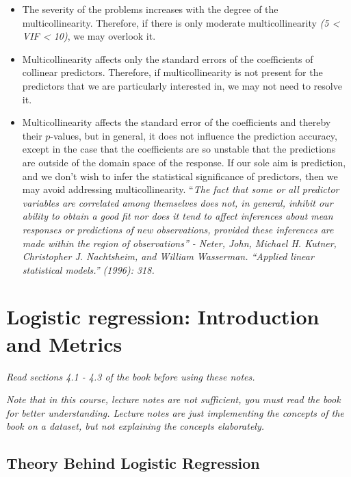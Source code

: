 \documentclass[
  letterpaper,
  DIV=11,
  numbers=noendperiod]{scrreprt}
\begin{document}
\begin{itemize}
\item
  The severity of the problems increases with the degree of the
  multicollinearity. Therefore, if there is only moderate
  multicollinearity \emph{(5 \textless{} VIF \textless{} 10)}, we may
  overlook it.
\item
  Multicollinearity affects only the standard errors of the coefficients
  of collinear predictors. Therefore, if multicollinearity is not
  present for the predictors that we are particularly interested in, we
  may not need to resolve it.
\item
  Multicollinearity affects the standard error of the coefficients and
  thereby their \(p\)-values, but in general, it does not influence the
  prediction accuracy, except in the case that the coefficients are so
  unstable that the predictions are outside of the domain space of the
  response. If our sole aim is prediction, and we don't wish to infer
  the statistical significance of predictors, then we may avoid
  addressing multicollinearity. ``\emph{The fact that some or all
  predictor variables are correlated among themselves does not, in
  general, inhibit our ability to obtain a good fit nor does it tend to
  affect inferences about mean responses or predictions of new
  observations, provided these inferences are made within the region of
  observations'' - Neter, John, Michael H. Kutner, Christopher J.
  Nachtsheim, and William Wasserman. ``Applied linear statistical
  models.'' (1996): 318.}
\end{itemize}


\chapter{Logistic regression: Introduction and
Metrics}\label{logistic-regression-introduction-and-metrics}

\emph{Read sections 4.1 - 4.3 of the book before using these notes.}

\emph{Note that in this course, lecture notes are not sufficient, you
must read the book for better understanding. Lecture notes are just
implementing the concepts of the book on a dataset, but not explaining
the concepts elaborately.}

\section{Theory Behind Logistic
Regression}\label{theory-behind-logistic-regression}
\end{document}
